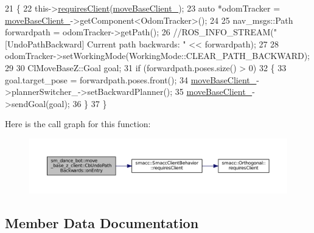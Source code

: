 \begin{DoxyCode}
21   \{
22     this->\hyperlink{classsmacc_1_1SmaccClientBehavior_a917f001e763a1059af337bf4e164f542}{requiresClient}(\hyperlink{classsm__dance__bot_1_1move__base__z__client_1_1CbUndoPathBackwards_a1f7d4e9c10eac4bef3f729967daf49d2}{moveBaseClient\_});
23     \textcolor{keyword}{auto} *odomTracker = \hyperlink{classsm__dance__bot_1_1move__base__z__client_1_1CbUndoPathBackwards_a1f7d4e9c10eac4bef3f729967daf49d2}{moveBaseClient\_}->getComponent<OdomTracker>();
24 
25     nav\_msgs::Path forwardpath = odomTracker->getPath();
26     \textcolor{comment}{//ROS\_INFO\_STREAM("[UndoPathBackward] Current path backwards: " << forwardpath);}
27 
28     odomTracker->setWorkingMode(WorkingMode::CLEAR\_PATH\_BACKWARD);
29 
30     ClMoveBaseZ::Goal goal;
31     \textcolor{keywordflow}{if} (forwardpath.poses.size() > 0)
32     \{
33       goal.target\_pose = forwardpath.poses.front();
34       \hyperlink{classsm__dance__bot_1_1move__base__z__client_1_1CbUndoPathBackwards_a1f7d4e9c10eac4bef3f729967daf49d2}{moveBaseClient\_}->plannerSwitcher\_->setBackwardPlanner();
35       \hyperlink{classsm__dance__bot_1_1move__base__z__client_1_1CbUndoPathBackwards_a1f7d4e9c10eac4bef3f729967daf49d2}{moveBaseClient\_}->sendGoal(goal);
36     \}
37   \}
\end{DoxyCode}


Here is the call graph for this function\+:
\nopagebreak
\begin{figure}[H]
\begin{center}
\leavevmode
\includegraphics[width=350pt]{classsm__dance__bot_1_1move__base__z__client_1_1CbUndoPathBackwards_a4d5ae7f19351854449c4ba7f2f83d462_cgraph}
\end{center}
\end{figure}




\subsection{Member Data Documentation}
